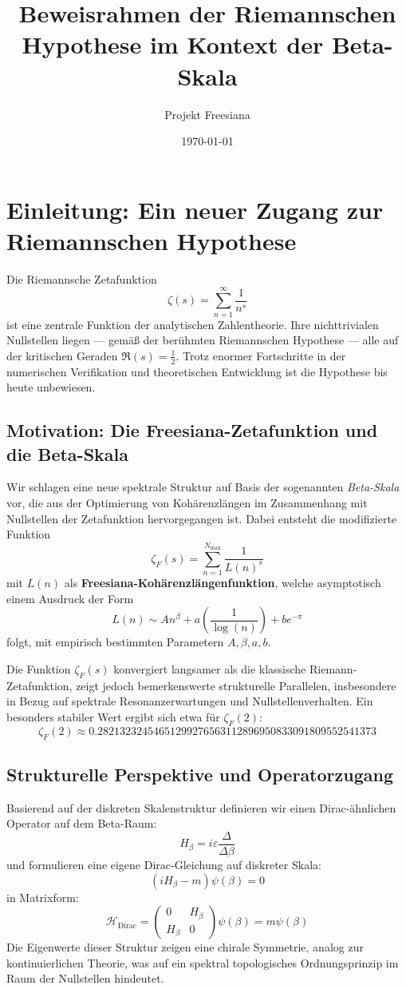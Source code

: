 \documentclass[12pt,a4paper]{article}
\title{Beweisrahmen der Riemannschen Hypothese im Kontext der Beta-Skala}
\author{Projekt Freesiana}
\date{\today}
\begin{document}
\maketitle

\section*{Einleitung: Ein neuer Zugang zur Riemannschen Hypothese}

Die Riemannsche Zetafunktion
\[
\zeta(s) = \sum_{n=1}^{\infty} \frac{1}{n^s}
\]
ist eine zentrale Funktion der analytischen Zahlentheorie. Ihre nichttrivialen Nullstellen liegen — gemäß der berühmten Riemannschen Hypothese — alle auf der kritischen Geraden $\Re(s) = \frac{1}{2}$. Trotz enormer Fortschritte in der numerischen Verifikation und theoretischen Entwicklung ist die Hypothese bis heute unbewiesen.

\subsection*{Motivation: Die Freesiana-Zetafunktion und die Beta-Skala}

Wir schlagen eine neue spektrale Struktur auf Basis der sogenannten \emph{Beta-Skala} vor, die aus der Optimierung von Kohärenzlängen im Zusammenhang mit Nullstellen der Zetafunktion hervorgegangen ist. Dabei entsteht die modifizierte Funktion
\[
\zeta_F(s) = \sum_{n=1}^{N_{\max}} \frac{1}{L(n)^s}
\]
mit $L(n)$ als \textbf{Freesiana-Kohärenzlängenfunktion}, welche asymptotisch einem Ausdruck der Form
\[
L(n) \sim A n^\beta + a \left( \frac{1}{\log(n)} \right) + b e^{-\pi}
\]
folgt, mit empirisch bestimmten Parametern $A, \beta, a, b$.

Die Funktion $\zeta_F(s)$ konvergiert langsamer als die klassische Riemann-Zetafunktion, zeigt jedoch bemerkenswerte strukturelle Parallelen, insbesondere in Bezug auf spektrale Resonanzerwartungen und Nullstellenverhalten. Ein besonders stabiler Wert ergibt sich etwa für $\zeta_F(2)$:
\[
\zeta_F(2) \approx 0.28213232454651299276563112896950833091809552541373
\]

\subsection*{Strukturelle Perspektive und Operatorzugang}

Basierend auf der diskreten Skalenstruktur definieren wir einen Dirac-ähnlichen Operator auf dem Beta-Raum:
\[
H_\beta = i \varepsilon \frac{\Delta}{\Delta \beta}
\]
und formulieren eine eigene Dirac-Gleichung auf diskreter Skala:
\[
(i H_\beta - m)\psi(\beta) = 0
\]
in Matrixform:
\[
\mathcal{H}_{\text{Dirac}} =
\begin{pmatrix}
0 & H_\beta \\
H_\beta & 0
\end{pmatrix}
\psi(\beta)
= m \psi(\beta)
\]
Die Eigenwerte dieser Struktur zeigen eine chirale Symmetrie, analog zur kontinuierlichen Theorie, was auf ein spektral topologisches Ordnungsprinzip im Raum der Nullstellen hindeutet.
\end{document}
